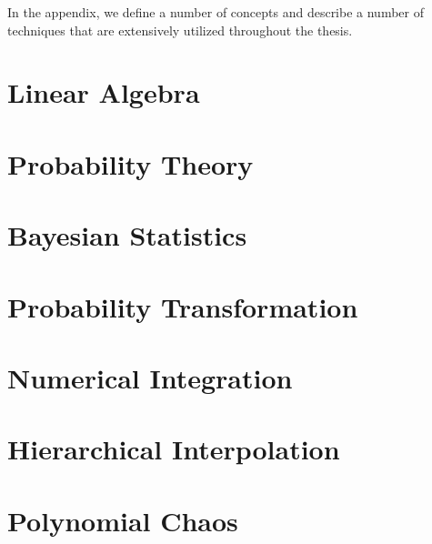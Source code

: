 In the appendix, we define a number of concepts and describe a number of
techniques that are extensively utilized throughout the thesis.

\section{Linear Algebra}

\section{Probability Theory}

\section{Bayesian Statistics}

\section{Probability Transformation}

\section{Numerical Integration}

\section{Hierarchical Interpolation}

\section{Polynomial Chaos}
